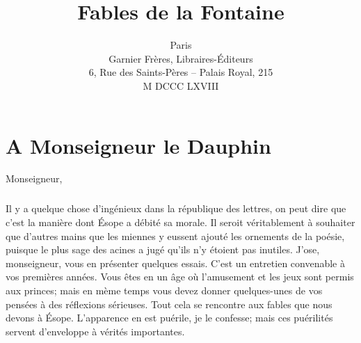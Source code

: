 \documentclass{book}
\title{Fables de la Fontaine}
\date{Paris\\Garnier Fr\`eres, Libraires-\'Editeurs\\6, Rue des Saints-P\`eres -- Palais Royal, 215\\M DCCC LXVIII}
\begin{document}
\frontmatter
\begin{titlepage}
\maketitle
\end{titlepage}
\chapter*{A Monseigneur le Dauphin}
Monseigneur,
\paragraph{}
Il y a quelque chose d'ing\'enieux dans la r\'epublique des lettres, on peut dire que c'est la mani\`ere dont \'Esope a d\'ebit\'e sa morale. Il seroit v\'eritablement \`a souhaiter que d'autres mains que les miennes y eussent ajout\'e les ornements de la po\'esie, puisque le plus sage des acines a jug\'e qu'ils n'y \'etoient pas inutiles. J'ose, monseigneur, vous en pr\'esenter quelques essais. C'est un entretien convenable \`a vos premi\`eres ann\'ees. Vous \^etes en un \^age o\`u l'amusement et les jeux sont permis aux princes; mais en m\`eme temps vous devez donner quelques-unes de vos pens\'ees \`a des r\'eflexions s\'erieuses. Tout cela se rencontre aux fables que nous devons \`a \'Esope. L'apparence en est pu\'erile, je le confesse; mais ces pu\'erilit\'es servent d'enveloppe \`a v\'erit\'es importantes.
\end{document}
